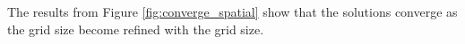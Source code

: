  The results from Figure \ref{fig:converge_spatial} show that the solutions converge as the grid size become refined with the grid size.


%
%
%
 
%
%
%


